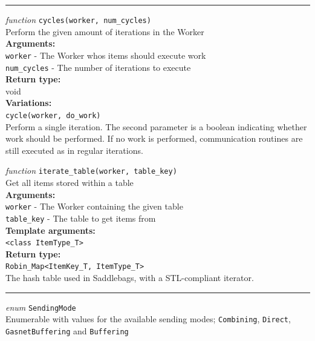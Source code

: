 \documentclass{uit-report}
\begin{document}
\vskip 0.5cm
\begin{center}
	\noindent\rule{4cm}{1.2pt}
\end{center}
\vskip 0.7cm

\textit{function} \texttt{cycles(worker, num\_cycles)}\\
\phantom{11111} Perform the given amount of iterations in the Worker\\
\textbf{Arguments:}\\
\phantom{11111} \texttt{worker} - The Worker whos items should execute work\\
\phantom{11111} \texttt{num\_cycles} - The number of iterations to execute\\
\textbf{Return type:}\\
\phantom{11111}  void\\
\textbf{Variations:}\\
\phantom{11111} \texttt{cycle(worker, do\_work)}\\
\phantom{11111} \phantom{11111} Perform a single iteration. The second parameter is a boolean indicating whether work should be performed. If no work is performed, communication routines are still executed as in regular iterations.
\newpage


\textit{function} \texttt{iterate\_table(worker, table\_key)}\\
\phantom{11111} Get all items stored within a table\\
\textbf{Arguments:}\\
\phantom{11111} \texttt{worker} - The Worker containing the given table\\
\phantom{11111} \texttt{table\_key} - The table to get items from\\
\textbf{Template arguments:}\\
\phantom{11111} \texttt{<class ItemType\_T>}\\
\textbf{Return type:}\\
\phantom{11111}  \texttt{Robin\_Map<ItemKey\_T, ItemType\_T>}\\
\phantom{11111}\phantom{11111} The hash table used in Saddlebags, with a STL-compliant iterator.

\begin{center}
	\noindent\rule{4cm}{1.2pt}
\end{center}

\textit{enum} \texttt{SendingMode}\\
\phantom{11111} Enumerable with values for the available sending modes;
\texttt{Combining},
\texttt{Direct},
\texttt{GasnetBuffering} and \texttt{Buffering}
\end{document}

